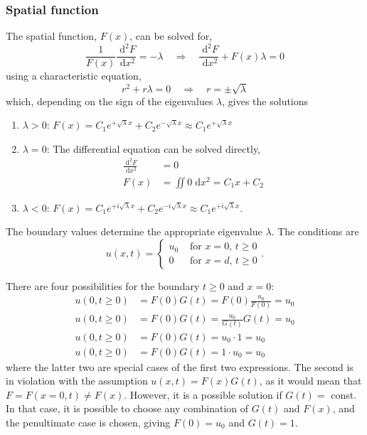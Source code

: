 \documentclass[a4paper,11pt]{article}
\newcommand{\diff}{\ensuremath{\; \text{d}}}
\begin{document}
\subsubsection{Spatial function}
The spatial function, $F(x)$, can be solved for, 
\[ \frac{1}{F(x)} \frac{\!\diff^2 F}{\diff x^2} = -\lambda \quad\Rightarrow\quad
\frac{\!\diff^2 F}{\!\diff x^2} + F(x) \lambda = 0 \]
using a characteristic equation,
\[ r^2 + r\lambda = 0 \quad \Rightarrow \quad r = \pm \sqrt{\lambda} \]
which, depending on the sign of the eigenvalues $\lambda$, gives the solutions
\begin{enumerate}
    \item $\lambda > 0$: $F(x) = C_1 e^{+ \sqrt{\lambda} x} + C_2 e^{- \sqrt{\lambda} x} \approx C_1 e^{+ \sqrt{\lambda} x}$
    \item $\lambda = 0$: The differential equation can be solved directly,
        \begin{align*}
            \frac{\!\diff^2 F}{\!\diff x^2} &= 0 \\
            F(x) &= \iint 0 \diff x^2 = C_1 x + C_2
        \end{align*}
    \item $\lambda < 0$: $F(x) = C_1 e^{+ i \sqrt{\lambda} x} + C_2 e^{- i \sqrt{\lambda} x} \approx C_1 e^{+ i \sqrt{\lambda} x}$.
\end{enumerate}

The boundary values determine the appropriate eigenvalue $\lambda$. The conditions are
\begin{equation}
    u(x,t) =
    \begin{cases}
        u_0 &\text{ for } x=0,\, t\geq 0 \\
        0   &\text{ for } x=d,\, t\geq 0
    \end{cases}.
    \label{eq:boundaries}
\end{equation}

There are four possibilities for the boundary $t\geq 0$ and $x=0$:
\begin{align*}
    u(0,t\geq 0) &= F(0)G(t) = F(0) \frac{u_0}{F(0)}  = u_0 \\
    u(0,t\geq 0) &= F(0)G(t) = \frac{u_0}{G(t)} G(t) = u_0 \\
    u(0,t\geq 0) &= F(0)G(t) = u_0 \cdot 1 = u_0 \\
    u(0,t\geq 0) &= F(0)G(t) = 1 \cdot u_0 = u_0
\end{align*}
where the latter two are special cases of the first two expressions. The second is in violation with the assumption $u(x,t) = F(x)G(t)$, as it would mean that $F = F(x=0,t) \neq F(x)$. However, it is a possible solution if $G(t) =$ const. In that case, it is possible to choose any combination of $G(t)$ and $F(x)$, and the penultimate case is chosen, giving $F(0) = u_0$ and $G(t) = 1$.
\end{document}
